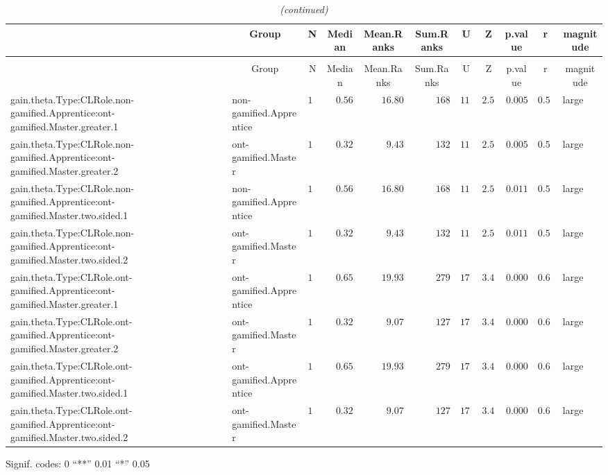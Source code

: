 \documentclass[6pt]{article}
\begin{document}
\setlongtables\begin{landscape}{\scriptsize
\begin{longtable}{llrrrrrrrrl}\caption{Descriptive statistic of the pair wilcoxon analysis } \tabularnewline
\hline\hline
\multicolumn{1}{l}{}&\multicolumn{1}{c}{Group}&\multicolumn{1}{c}{N}&\multicolumn{1}{c}{Median}&\multicolumn{1}{c}{Mean.Ranks}&\multicolumn{1}{c}{Sum.Ranks}&\multicolumn{1}{c}{U}&\multicolumn{1}{c}{Z}&\multicolumn{1}{c}{p.value}&\multicolumn{1}{c}{r}&\multicolumn{1}{c}{magnitude}\tabularnewline
\hline
\endfirsthead\caption[]{\em (continued)} \tabularnewline
\hline
\multicolumn{1}{l}{}&\multicolumn{1}{c}{Group}&\multicolumn{1}{c}{N}&\multicolumn{1}{c}{Median}&\multicolumn{1}{c}{Mean.Ranks}&\multicolumn{1}{c}{Sum.Ranks}&\multicolumn{1}{c}{U}&\multicolumn{1}{c}{Z}&\multicolumn{1}{c}{p.value}&\multicolumn{1}{c}{r}&\multicolumn{1}{c}{magnitude}\tabularnewline
\hline
\endhead
\hline
\endfoot
\label{result}
gain.theta.Type:CLRole.non-gamified.Apprentice:ont-gamified.Master.greater.1&non-gamified.Apprentice&$10$&$0.56$&$16.80$&$168$&$113$&$2.52$&$0.005$&$0.514$&large\tabularnewline
gain.theta.Type:CLRole.non-gamified.Apprentice:ont-gamified.Master.greater.2&ont-gamified.Master&$14$&$0.32$&$ 9.43$&$132$&$113$&$2.52$&$0.005$&$0.514$&large\tabularnewline
gain.theta.Type:CLRole.non-gamified.Apprentice:ont-gamified.Master.two.sided.1&non-gamified.Apprentice&$10$&$0.56$&$16.80$&$168$&$113$&$2.52$&$0.011$&$0.514$&large\tabularnewline
gain.theta.Type:CLRole.non-gamified.Apprentice:ont-gamified.Master.two.sided.2&ont-gamified.Master&$14$&$0.32$&$ 9.43$&$132$&$113$&$2.52$&$0.011$&$0.514$&large\tabularnewline
gain.theta.Type:CLRole.ont-gamified.Apprentice:ont-gamified.Master.greater.1&ont-gamified.Apprentice&$14$&$0.65$&$19.93$&$279$&$174$&$3.49$&$0.000$&$0.660$&large\tabularnewline
gain.theta.Type:CLRole.ont-gamified.Apprentice:ont-gamified.Master.greater.2&ont-gamified.Master&$14$&$0.32$&$ 9.07$&$127$&$174$&$3.49$&$0.000$&$0.660$&large\tabularnewline
gain.theta.Type:CLRole.ont-gamified.Apprentice:ont-gamified.Master.two.sided.1&ont-gamified.Apprentice&$14$&$0.65$&$19.93$&$279$&$174$&$3.49$&$0.000$&$0.660$&large\tabularnewline
gain.theta.Type:CLRole.ont-gamified.Apprentice:ont-gamified.Master.two.sided.2&ont-gamified.Master&$14$&$0.32$&$ 9.07$&$127$&$174$&$3.49$&$0.000$&$0.660$&large\tabularnewline
\hline
\end{longtable}}\end{landscape}
\begin{flushright}{ \tiny{ Signif. codes:  0 ``**'' 0.01 ``*'' 0.05 }}\end{flushright} 
\end{document}

